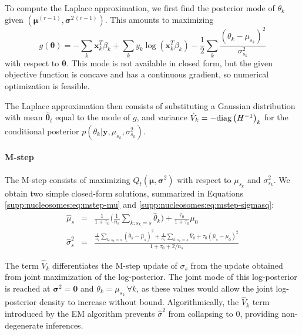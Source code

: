 To compute the Laplace approximation, we first find the posterior mode of
$\theta_k$ given $(\bm \mu^{(r-1)}, \bm \sigma^{2\,(r-1)})$. This amounts to
maximizing
\begin{equation}\label{supp:nucleosomes:eq:gFunction}
 g(\bm \theta) = -\sum_k \bm x_k^T \beta_k +
\sum_k y_k \log \left( \bm x_k^T \beta_k \right) -
\frac{1}{2} \sum_k \frac{(\theta_k - \mu_{s_k})^2}{\sigma^2_{s_k}}
\end{equation}
with respect to $\bm \theta$.
This mode is not available in closed form, but the given objective function is concave and has a continuous gradient, so numerical optimization is feasible.

%
The Laplace approximation then consists of substituting a Gaussian distribution with mean $\bm \hat{\theta}_t$ equal to the mode of $g$, and variance $\hat{V}_k = -\mathrm{diag}\left(H^{-1}\right)_k$ for the conditional posterior $p(\theta_k | \bm y, \mu_{s_k}, \sigma^2_{s_k} )$.

\paragraph{M-step}
%
The M-step consists of maximizing $Q_t(\bm \mu, \bm \sigma^2)$ with respect to $\mu_{s_k}$ and $\sigma^2_{s_k}$.
We obtain two simple closed-form solutions, summarized in Equations \ref{supp:nucleosomes:eq:mstep-mu} and \ref{supp:nucleosomes:eq:mstep-sigmasq}:
\begin{eqnarray} \label{supp:nucleosomes:eq:mstep-mu}
\hat{\mu}_{s} &=& \frac{1}{1 + \tau_0} \Big(\frac{1}{n_s}
 \sum_{k:s_k = s} \hat{\theta}_k \Big) +
 \frac{\tau_0}{1 + \tau_0} \mu_0 \\ \label{supp:nucleosomes:eq:mstep-sigmasq}
\hat{\sigma}^2_{s} &=& \frac{\frac{1}{n_s} \sum_{k:s_k = s}
 (\hat{\theta}_k - \hat{\mu}_{s})^2
 + \frac{1}{n_s} \sum_{k:s_k = s} \hat{V}_k +
 \tau_0 (\hat{\mu}_s - \mu_0)^2}{1+\tau_0 + 2 / n_s}
\end{eqnarray}

The term $\hat{V}_k$ differentiates the M-step update of $\sigma_s$ from the update obtained from joint maximization of the log-posterior.
The joint mode of this log-posterior is reached at $\bm \sigma^2 = \bm 0$ and $\theta_k = \mu_{s_k} \, \forall k$, as these values would allow the joint log-posterior density to increase without bound.
Algorithmically, the $\hat{V}_k$ term introduced by the EM algorithm prevents $\hat{\sigma}^2$ from collapsing to $0$, providing non-degenerate inferences.

